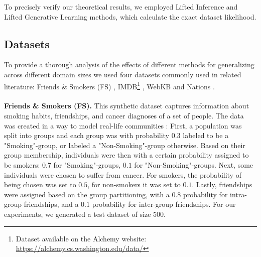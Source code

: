 To precisely verify our theoretical results, we employed Lifted Inference \cite{kersting2012lifted,First_Order_Prob_Inf} and Lifted Generative Learning \cite{vanHaaren2016} methods, which calculate the exact dataset likelihood. 



\subsection{Datasets}

To provide a thorough analysis of the effects of different methods for generalizing across different domain sizes we used four datasets commonly used in related literature: Friends \& Smokers (FS) \cite{singla2008}, IMDB\footnote{\label{note2}Dataset available on the Alchemy website: \href{https://alchemy.cs.washington.edu/data/}{https://alchemy.cs.washington.edu/data/}} \cite{mihalkova2007}, WebKB \cite{mihalkova2007} and Nations \cite{rummel1992}.\\
\\
\noindent \textbf{Friends \& Smokers (FS).} This synthetic dataset captures information about smoking habits, friendships, and cancer diagnoses of a set of people. The data was created in a way to model real-life communities \cite{DA_MLN}: First, a population was split into groups and each group was with probability $0.3$ labeled to be a "Smoking"-group, or labeled a "Non-Smoking"-group otherwise. Based on their group membership, individuals were then with a certain probability assigned to be smokers: $0.7$ for "Smoking"-groups, $0.1$ for "Non-Smoking"-groups. Next, some individuals were chosen to suffer from cancer. For smokers, the probability of being chosen was set to $0.5$, for non-smokers it was set to $0.1$. Lastly, friendships were assigned based on the group partitioning, with a $0.8$ probability for intra-group friendships, and a $0.1$ probability for inter-group friendships. For our experiments, we generated a test dataset of size 500.\\
